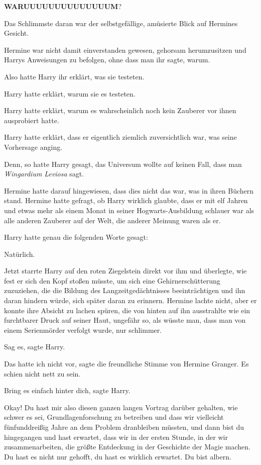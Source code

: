 \textbf{WARUUUUUUUUUUUUUUM}?

Das Schlimmste daran war der selbstgefällige, amüsierte Blick auf Hermines
Gesicht.

Hermine war nicht damit einverstanden gewesen, gehorsam herumzusitzen und Harrys
Anweisungen zu befolgen, ohne dass man ihr sagte, warum.

Also hatte Harry ihr erklärt, was sie testeten.

Harry hatte erklärt, warum sie es testeten.

Harry hatte erklärt, warum es wahrscheinlich noch kein Zauberer vor ihnen
ausprobiert hatte.

Harry hatte erklärt, dass er eigentlich ziemlich zuversichtlich war, was seine
Vorhersage anging.

Denn, so hatte Harry gesagt, das Universum wollte auf keinen Fall, dass man
\emph{\glqq Wingardium Leviosa\grqq{}} sagt.

Hermine hatte darauf hingewiesen, dass dies nicht das war, was in ihren Büchern
stand. Hermine hatte gefragt, ob Harry wirklich glaubte, dass er mit elf Jahren
und etwas mehr als einem Monat in seiner Hogwarts-Ausbildung schlauer war als
alle anderen Zauberer auf der Welt, die anderer Meinung waren als er.

Harry hatte genau die folgenden Worte gesagt:

\glqq Natürlich.\grqq{}

Jetzt starrte Harry auf den roten Ziegelstein direkt vor ihm und überlegte, wie
fest er sich den Kopf stoßen müsste, um sich eine Gehirnerschütterung
zuzuziehen, die die Bildung des Langzeitgedächtnisses beeinträchtigen und ihn
daran hindern würde, sich später daran zu erinnern. Hermine lachte nicht, aber
er konnte ihre Absicht zu lachen spüren, die von hinten auf ihn ausstrahlte wie
ein furchtbarer Druck auf seiner Haut, ungefähr so, als wüsste man, dass man von
einem Serienmörder verfolgt wurde, nur schlimmer.

\glqq Sag es\grqq{}, sagte Harry.

\glqq Das hatte ich nicht vor\grqq{}, sagte die freundliche Stimme von Hermine
Granger. \glqq Es schien nicht nett zu sein.\grqq{}

\glqq Bring es einfach hinter dich\grqq{}, sagte Harry.

\glqq Okay! Du hast mir also diesen ganzen langen Vortrag darüber gehalten, wie
schwer es sei, Grundlagenforschung zu betreiben und dass wir vielleicht
fünfunddreißig Jahre an dem Problem dranbleiben müssten, und dann bist du
hingegangen und hast erwartet, dass wir in der ersten Stunde, in der wir
zusammenarbeiten, die größte Entdeckung in der Geschichte der Magie machen. Du
hast es nicht nur gehofft, du hast es wirklich erwartet. Du bist albern.\grqq{}

